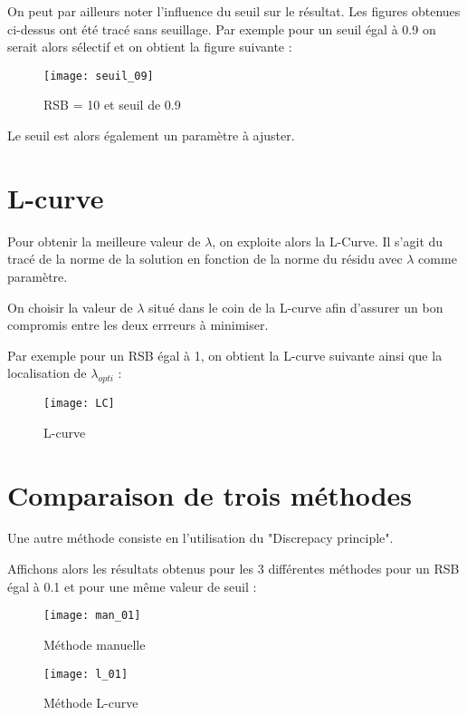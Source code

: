 \documentclass[12pt,a4paper,titlepage]{article}
\begin{document}
On peut par ailleurs noter l'influence du seuil sur le résultat. Les figures obtenues ci-dessus
ont été tracé sans seuillage. Par exemple pour un seuil égal à 0.9 on serait alors sélectif
et on obtient la figure suivante :

\begin{figure}[H]
    \caption{RSB = 10 et seuil de 0.9}
    \texttt{[image: seuil\_09]}
    \centering
\end{figure}

Le seuil est alors également un paramètre à ajuster.

\section{L-curve}

Pour obtenir la meilleure valeur de $\lambda$,  on exploite alors
la L-Curve. Il s'agit du tracé de la norme de la solution en fonction
de la norme du résidu avec $\lambda$ comme paramètre.

On choisir la valeur de $\lambda$ situé dans le coin de la L-curve afin d'assurer un bon
compromis entre les deux errreurs à minimiser.

Par exemple pour un RSB égal à 1, on obtient la L-curve suivante ainsi que la localisation
de $\lambda_{opti}$ :

\begin{figure}[H]
    \caption{L-curve}
    \label{brain}
    \texttt{[image: LC]}
    \centering
\end{figure}

\section{Comparaison de trois méthodes}

Une autre méthode consiste en l'utilisation du "Discrepacy principle".

Affichons alors les résultats obtenus pour les 3 différentes méthodes pour un RSB égal à 0.1
et pour une même valeur de seuil :

\begin{figure}[H]
    \caption{Méthode manuelle}
    \label{brain}
    \texttt{[image: man\_01]}
    \centering
\end{figure}

\begin{figure}[H]
    \caption{Méthode L-curve}
    \label{brain}
    \texttt{[image: l\_01]}
    \centering
\end{figure}
\end{document}
